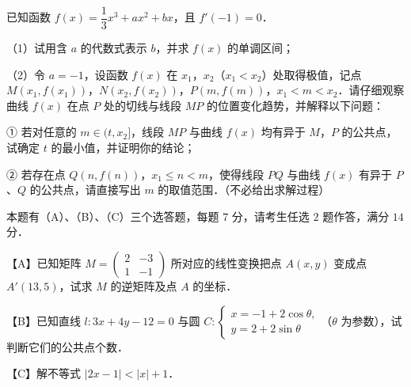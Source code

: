 \endgroup
\begin{question}
已知函数 $f(x)=\dfrac13x^3+ax^2+bx$，且 $f'(-1)=0$．

（1）试用含 $a$ 的代数式表示 $b$，并求 $f(x)$ 的单调区间；

（2）令 $a=-1$，设函数 $f(x)$ 在 $x_1$，$x_2$（$x_1<x_2$）处取得极值，记点 $M(x_1,f(x_1))$，$N(x_2,f(x_2))$，$P(m,f(m))$，$x_1<m<x_2$．请仔细观察曲线 $f(x)$ 在点 $P$ 处的切线与线段 $MP$ 的位置变化趋势，并解释以下问题：

① 若对任意的 $m\in(t,x_2]$，线段 $MP$ 与曲线 $f(x)$ 均有异于 $M$，$P$ 的公共点，试确定 $t$ 的最小值，并证明你的结论；

② 若存在点 $Q(n,f(n))$，$x_1\leqslant n<m$，使得线段 $PQ$ 与曲线 $f(x)$ 有异于 $P$、$Q$ 的公共点，请直接写出 $m$ 的取值范围．（不必给出求解过程）

\end{question}
\begin{question}
本题有（A）、（B）、（C）三个选答题，每题 $7$ 分，请考生任选 $2$ 题作答，满分 $14$ 分．

【A】已知矩阵 $M=\begin{pmatrix}2&-3\\1&-1\end{pmatrix}$ 所对应的线性变换把点 $A(x,y)$ 变成点 $A'(13,5)$，试求 $M$ 的逆矩阵及点 $A$ 的坐标．

【B】已知直线 $l:3x+4y-12=0$ 与圆 $C:\begin{cases}x=-1+2\cos\theta,\\ y=2+2\sin\theta\end{cases}$（$\theta$ 为参数），试判断它们的公共点个数．

【C】解不等式 $|2x-1|<|x|+1$．

\end{question}